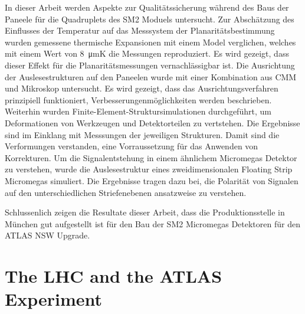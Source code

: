 \documentclass[
a4paper,                                %
twoside,                                %
BCOR1.4cm,                      %
10pt,                           %
headings=normal,                %
headsepline,                    %
clearplainpage, %
final,                                  %
div=14,
parskip=full,
openright,
bibliography=toc
]{scrreprt}
\begin{document}
In dieser Arbeit werden Aspekte zur Qualit\"atssicherung w\"ahrend des Baus der Paneele f\"ur die Quadruplets des SM2 Moduels untersucht. Zur Absch\"atzung des Einflusses der Temperatur auf das Messsystem der Planarit\"atsbestimmung wurden gemessene thermische Expansionen mit einem Model verglichen, welches mit einem Wert von \SI{8}{\micro\m}K die Messungen reproduziert. Es wird gezeigt, dass dieser Effekt f\"ur die Planarit\"atsmessungen vernachl\"assigbar ist. Die Ausrichtung der Auslesestrukturen auf den Paneelen wurde mit einer Kombination aus CMM und Mikroskop untersucht. Es wird gezeigt, dass das Ausrichtungsverfahren prinzipiell funktioniert, Verbesserungenm\"oglichkeiten werden beschrieben. Weiterhin wurden Finite-Element-Struktursimulationen durchgef\"uhrt, um Deformationen von Werkzeugen und Detektorteilen zu vertstehen. Die Ergebnisse sind im Einklang mit Messsungen der jeweiligen Strukturen. Damit sind die Verformungen verstanden, eine Vorraussetzung f\"ur das Anwenden von Korrekturen. Um die Signalentstehung in einem \"ahnlichem Micromegas Detektor zu verstehen, wurde die Auslesestruktur eines zweidimensionalen Floating Strip Micromegas simuliert. Die Ergebnisse tragen dazu bei, die Polarit\"at von Signalen auf den unterschiedlichen Striefenebenen ansatzweise zu verstehen.

Schlussenlich zeigen die Resultate dieser Arbeit, dass die Produktionsstelle in M\"unchen gut aufgestellt ist f\"ur den Bau der SM2 Micromegas Detektoren f\"ur den ATLAS NSW Upgrade.

\thispagestyle{empty}
\cleardoublepage

\thispagestyle{empty}

\newpage

\tableofcontents

\cleardoublepage


\chapter{The LHC and the ATLAS Experiment}
\end{document}
